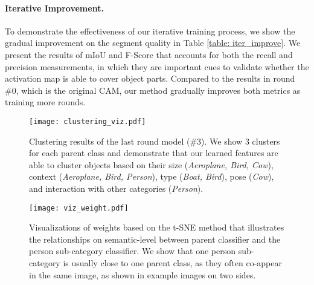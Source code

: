 \documentclass[10pt,twocolumn,letterpaper]{article}
\begin{document}
\vspace{-2mm}
\paragraph{Iterative Improvement.}
To demonstrate the effectiveness of our iterative training process, we show the gradual improvement on the segment quality in Table \ref{table: iter_improve}.
We present the results of mIoU and F-Score that accounts for both the recall and precision measurements, in which they are important cues to validate whether the activation map is able to cover object parts.
Compared to the results in round \#0, which is the original CAM, our method gradually improves both metrics as training more rounds.



















\begin{figure*}[t]
	\centering
	\texttt{[image: clustering\_viz.pdf]}\\
	\vspace{-2mm}
	\caption{Clustering results of the last round model (\#3). We show 3 clusters for each parent class and demonstrate that our learned features are able to cluster objects based on their size (\textit{Aeroplane, Bird, Cow}), context (\textit{Aeroplane, Bird, Person}), type (\textit{Boat, Bird}), pose (\textit{Cow}), and interaction with other categories (\textit{Person}).
	}
	\label{fig: cluster_viz}
\end{figure*}

\begin{figure*}[t]
	\centering
	\texttt{[image: viz\_weight.pdf]}\\
\caption{Visualizations of weights based on the 
	t-SNE method that illustrates the relationships on semantic-level between parent classifier and the person sub-category classifier. We show that one person sub-category is usually close to one parent class, as they often co-appear in the same image, as shown in example images on two sides.}
	\label{fig: weight_viz}
\end{figure*}
\end{document}
